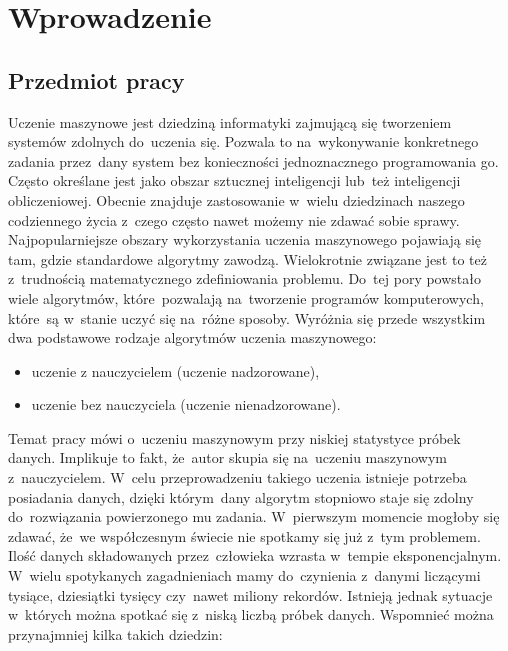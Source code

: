 \section{Wprowadzenie}\label{intro}
\subsection{Przedmiot pracy}\label{matter}
Uczenie maszynowe jest dziedziną informatyki zajmującą się tworzeniem systemów zdolnych do~uczenia się. Pozwala to na~wykonywanie konkretnego zadania przez~dany system bez konieczności jednoznacznego programowania go. 
Często określane jest jako obszar sztucznej inteligencji lub~też inteligencji obliczeniowej\cite{stefanowski}. Obecnie znajduje zastosowanie w~wielu dziedzinach naszego codziennego życia z~czego często nawet możemy nie zdawać sobie sprawy.
Najpopularniejsze obszary wykorzystania uczenia maszynowego pojawiają się tam, gdzie standardowe algorytmy zawodzą. Wielokrotnie związane jest to też z~trudnością matematycznego zdefiniowania problemu. 
 Do~tej pory powstało wiele algorytmów, które~pozwalają na~tworzenie programów komputerowych, które~są w~stanie uczyć się na~różne sposoby. Wyróżnia się przede wszystkim dwa podstawowe rodzaje algorytmów uczenia maszynowego:
\begin{itemize}
\item uczenie z nauczycielem (uczenie nadzorowane),
\item uczenie bez nauczyciela (uczenie nienadzorowane).
\end{itemize}
Temat pracy mówi o~uczeniu maszynowym przy niskiej statystyce próbek danych. Implikuje to fakt, że~autor skupia się na~uczeniu maszynowym z~nauczycielem. W~celu przeprowadzeniu takiego uczenia istnieje potrzeba posiadania danych, dzięki którym~dany algorytm stopniowo staje się zdolny do~rozwiązania powierzonego mu zadania. W~pierwszym momencie mogłoby się zdawać, że~we współczesnym świecie nie spotkamy się już z~tym problemem. Ilość danych składowanych przez~człowieka wzrasta w~tempie eksponencjalnym. W~wielu spotykanych zagadnieniach mamy do~czynienia z~danymi liczącymi tysiące, dziesiątki tysięcy czy~nawet miliony rekordów. Istnieją jednak sytuacje w~których można spotkać się z~niską liczbą próbek danych. Wspomnieć można przynajmniej kilka takich dziedzin:
